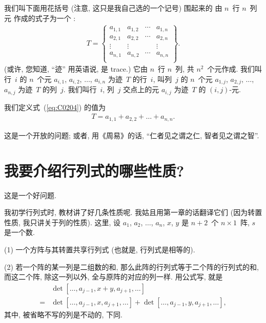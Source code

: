 \documentclass[%
    UTF8,%
    fontset=none,%
    punct=kaiming,%
    zihao=-4,%
    a4paper,%
    oneside,%
]{ctexbook}
\let\emph\relax
\begin{document}
\begin{definition}
    我们叫下面用花括号
    (注意, 这只是我自己选的一个记号)
    围起来的%
    由 \(n\)~行 \(n\)~列元%
    作成的式子为一个 \emph{\(n\)~级迹}:
    \begin{align}
        T =
        \begin{Bmatrix}
            a_{1,1} & a_{1,2} & \cdots & a_{1,n} \\
            a_{2,1} & a_{2,2} & \cdots & a_{2,n} \\
            \vdots  & \vdots  & {}     & \vdots  \\
            a_{n,1} & a_{n,2} & \cdots & a_{n,n} \\
        \end{Bmatrix}.
        \label{eq:C0204}
    \end{align}
    (或许, 您知道, ``迹'' 用英语说, 是
    trace.)
    它由 \(n\)~行 \(n\)~列, 共 \(n^2\)~个元作成.
    我们叫行~\(i\) 的 \(n\)~个元
    \(a_{i,1}\), \(a_{i,2}\), \(\dots\), \(a_{i,n}\)
    为迹~\(T\) 的行~\(i\),
    叫列~\(j\) 的 \(n\)~个元
    \(a_{1,j}\), \(a_{2,j}\), \(\dots\), \(a_{n,j}\)
    为迹~\(T\) 的列~\(j\).
    我们叫行~\(i\), 列~\(j\) 交点上的元 \(a_{i,j}\)
    为迹~\(T\) 的 \((i,j)\)-元.

    我们定义式~(\ref{eq:C0204}) 的值为
    \begin{align*}
        T = a_{1,1} + a_{2,2} + \dots + a_{n,n}.
    \end{align*}
\end{definition}

这是一个开放的问题;
或者, 用《周易》的话,
``仁者见之谓之仁, 智者见之谓之智''.

\section{我要介绍行列式的哪些性质?}

这是一个好问题.

我初学行列式时, 教材讲了好几条性质呢.
我姑且用第一章的话翻译它们
(因为转置性质, 我只讲关于列的性质).
这里, 设 \(a_1\), \(a_2\), \(\dots\), \(a_n\), \(x\), \(y\)
是 \(n+2\)~个 \(n \times 1\)~阵,
\(s\) 是一个数.

\vspace{2ex}

(1)
一个方阵与其转置共享行列式
(也就是, 行列式是相等的).

(2)
若一个阵的某一列是二组数的和,
那么此阵的行列式等于二个阵的行列式的和,
而这二个阵, 除这一列以外, 全与原阵的对应的列一样.
用公式写, 就是
\begin{align*}
         & \det {[\dots, a_{j-1}, x + y, a_{j+1}, \dots]}
    \\
    = {} & \det {[\dots, a_{j-1}, x, a_{j+1}, \dots]}
    + \det {[\dots, a_{j-1}, y, a_{j+1}, \dots]},
\end{align*}
其中, 被省略不写的列是不动的, 下同.
\end{document}

